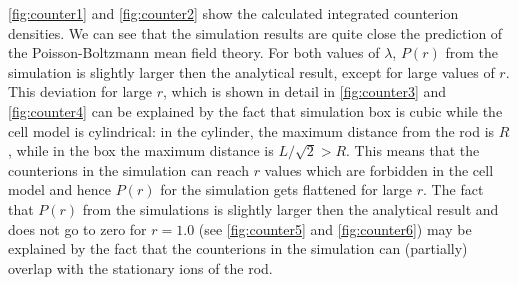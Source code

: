 \documentclass[a4paper,10pt,bibtotoc]{scrartcl}
\begin{document}
\autoref{fig:counter1} and \autoref{fig:counter2} show the calculated integrated counterion densities.
We can see that the simulation results are quite close the prediction of the Poisson-Boltzmann mean field theory. For both values of $\lambda$, $P(r)$ from the simulation is slightly larger then the analytical result, except for large values of $r$. This deviation for large $r$, which is shown in detail in \autoref{fig:counter3} and \autoref{fig:counter4} can be explained by the fact that simulation box is cubic while the cell model is cylindrical: in the cylinder, the maximum distance from the rod is $R$, while in the box the maximum distance is $L/\sqrt{2}>R$. This means that the counterions in the simulation can reach $r$ values which are forbidden in the cell model and hence $P(r)$ for the simulation gets flattened for large $r$. The fact that $P(r)$ from the simulations is slightly larger then the analytical result and does not go to zero for $r=1.0$ (see \autoref{fig:counter5} and \autoref{fig:counter6}) may be explained by the fact that the counterions in the simulation can (partially) overlap with the stationary ions of the rod.
\end{document}
